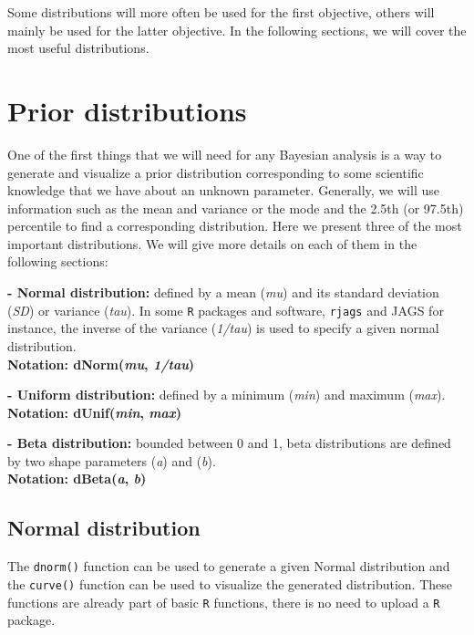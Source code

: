 \documentclass[
]{book}
\begin{document}
Some distributions will more often be used for the first objective, others will mainly be used for the latter objective. In the following sections, we will cover the most useful distributions.

\section{Prior distributions}\label{prior-distributions}

One of the first things that we will need for any Bayesian analysis is a way to generate and visualize a prior distribution corresponding to some scientific knowledge that we have about an unknown parameter. Generally, we will use information such as the mean and variance or the mode and the 2.5th (or 97.5th) percentile to find a corresponding distribution. Here we present three of the most important distributions. We will give more details on each of them in the following sections:

\textbf{- Normal distribution:} defined by a mean (\emph{mu}) and its standard deviation (\emph{SD}) or variance (\emph{tau}). In some \texttt{R} packages and software, \texttt{rjags} and JAGS for instance, the inverse of the variance (\emph{1/tau}) is used to specify a given normal distribution.\\
\textbf{Notation: dNorm(\emph{mu}, \emph{1/tau})}

\textbf{- Uniform distribution:} defined by a minimum (\emph{min}) and maximum (\emph{max}).\\
\textbf{Notation: dUnif(\emph{min}, \emph{max})}

\textbf{- Beta distribution:} bounded between 0 and 1, beta distributions are defined by two shape parameters (\emph{a}) and (\emph{b}).\\
\textbf{Notation: dBeta(\emph{a}, \emph{b})}

\subsection{Normal distribution}\label{normal-distribution}

The \texttt{dnorm()} function can be used to generate a given Normal distribution and the \texttt{curve()} function can be used to visualize the generated distribution. These functions are already part of basic \texttt{R} functions, there is no need to upload a \texttt{R} package.
\end{document}
